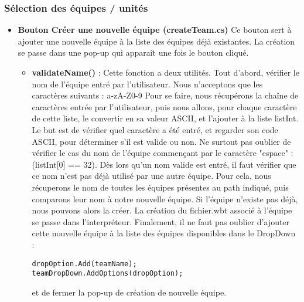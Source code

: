 \documentclass{article}
\begin{document}
\subsubsection{Sélection des équipes / unités}
\begin{itemize}
\item \textbf{Bouton Créer une nouvelle équipe (createTeam.cs)}
Ce bouton sert à ajouter une nouvelle équipe à la liste des équipes déjà existantes. La création se passe dans une pop-up qui apparaît une fois le bouton cliqué.
\smallbreak
\begin{itemize}
\item\textbf{validateName()} : Cette fonction a deux utilités. Tout d'abord, vérifier le nom de l'équipe entré par l'utilisateur. Nous n'acceptons que les caractères suivants : a-zA-Z0-9\newline
Pour se faire, nous récupérons la chaîne de caractères entrée par l'utilisateur, puis nous allons, pour chaque caractère de cette liste, le convertir en sa valeur ASCII, et l'ajouter à la liste listInt. Le but est de vérifier quel caractère a été entré, et regarder son code ASCII, pour déterminer s'il est valide ou non. Ne surtout pas oublier de vérifier le cas du nom de l'équipe commençant par le caractère "espace" : (listInt[0] == 32).\newline
Dès lors qu'un nom valide est entré, il faut vérifier que ce nom n'est pas déjà utilisé par une autre équipe. Pour cela, nous récuperons le nom de toutes les équipes présentes au path indiqué, puis comparons leur nom à notre nouvelle équipe.\newline
Si l'équipe n'existe pas déjà, nous pouvons alors la créer. La création du fichier.wbt associé à l'équipe se passe dans l'interpréteur.\newline
Finalement, il ne faut pas oublier d'ajouter cette nouvelle équipe à la liste des équipes disponibles dans le DropDown : 
\begin{lstlisting}[frame=single]
dropOption.Add(teamName);
teamDropDown.AddOptions(dropOption);
\end{lstlisting}
et de fermer la pop-up de création de nouvelle équipe.
\end{itemize}


\end{itemize}
\end{document}
